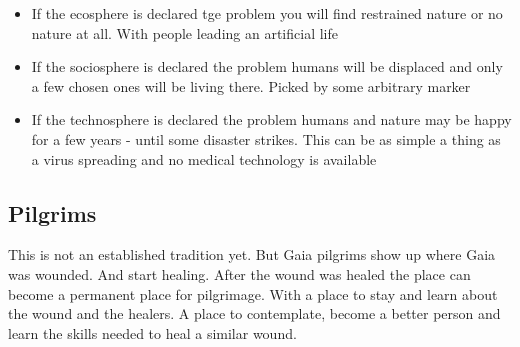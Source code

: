 \begin{itemize}
    \item If the ecosphere is declared tge problem you will find restrained nature or no nature at all. With people leading an artificial life
    \item If the sociosphere is declared the problem humans will be displaced and only a few chosen ones will be living there. Picked by some arbitrary marker
    \item If the technosphere is declared the problem humans and nature may be happy for a few years - until some disaster strikes. This can be as simple a thing as a virus spreading and no medical technology is available
\end{itemize}

\subsection{Pilgrims}

This is not an established tradition yet. But Gaia pilgrims show up where Gaia was wounded. And start healing. After the wound was healed the place can become a permanent place for pilgrimage. With a place to stay and learn about the wound and the healers. A place to contemplate, become a better person and learn the skills needed to heal a similar wound.



